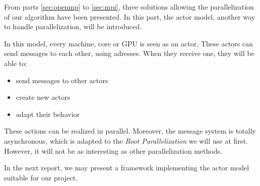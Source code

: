 From parts \ref{sec:openmp} to \ref{sec:mpi}, three solutions allowing the parallelization of our algorithm have been presented. In this part, the actor model, another way to handle parallelization, will be introduced.

In this model, every machine, core or GPU is seen as an actor. These actors can send messages to each other, using adresses. When they receive one, they will be able to:
\begin{itemize}
\item send messages to other actors
\item create new actors
\item adapt their behavior
\end{itemize}

These actions can be realized in parallel. Moreover, the message system is totally asynchronous, which is adapted to the \textit{Root Parallelization} we will use at first. However, it will not be as interesting as other parallelization methods.

In the next report, we may present a framework implementing the actor model suitable for our project.